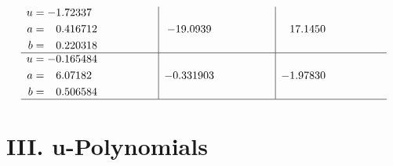\documentclass[1p]{elsarticle_modified}
\theoremstyle{definition}
\begin{document}
$$\begin{array}{c|c|c}
\begin{aligned}
u &= -1.72337\phantom{ +0.000000I} \\
a &= \phantom{-}0.416712\phantom{ +0.000000I} \\
b &= \phantom{-}0.220318\phantom{ +0.000000I}\end{aligned}
 & -19.0939\phantom{ +0.000000I} & \phantom{-}17.1450\phantom{ +0.000000I} \\ \hline\begin{aligned}
u &= -0.165484\phantom{ +0.000000I} \\
a &= \phantom{-}6.07182\phantom{ +0.000000I} \\
b &= \phantom{-}0.506584\phantom{ +0.000000I}\end{aligned}
 & -0.331903\phantom{ +0.000000I} & -1.97830\phantom{ +0.000000I}\\
 \hline 
 \end{array}$$\newpage
\newpage\renewcommand{\arraystretch}{1}
\centering \section*{ III. u-Polynomials}
\end{document}
